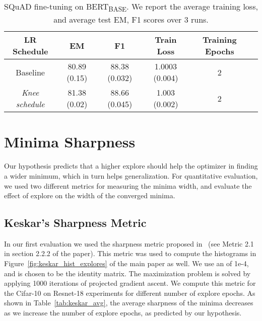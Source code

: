 \documentclass{article} \usepackage{iclr2021_conference,times}
\newcommand{\lrschedule}{\textit{Knee schedule}}
\begin{document}
\begin{table}[h]
\small
\centering
\caption{SQuAD fine-tuning on BERT\textsubscript{BASE}. We report the average training loss, and average test EM, F1 scores over 3 runs.}
\label{tab:squad_results}
{\setlength{\extrarowheight}{1pt}\begin{tabular}{cccccc}
  \toprule
  LR Schedule & EM  & F1 & Train Loss & Training Epochs \\
  \midrule
  Baseline   & 80.89 (0.15) & 88.38 (0.032) & 1.0003 (0.004) & 2\\
  \lrschedule{}{}   & 81.38 (0.02) & 88.66 (0.045) & 1.003 (0.002) & 2 \\
  \bottomrule
\end{tabular}}

\end{table}
 \section{Minima Sharpness}
\label{sec:metrics_for_wide_minima}
Our hypothesis predicts that a higher explore should help the optimizer in finding a wider minimum, which in turn helps generalization. For quantitative evaluation, we used two different metrics for measuring the minima width, and evaluate the effect of explore on the width of the converged minima.

\subsection{Keskar's Sharpness Metric~\cite{keskar2016large}}

In our first evaluation we used the sharpness metric proposed in~\cite{keskar2016large} (see Metric 2.1 in section 2.2.2 of the paper). This metric was used to compute the histograms in Figure~\ref{fig:keskar_hist_explores} of the main paper as well. We use an  of 1e-4, and  is chosen to be the identity matrix. The maximization problem is solved by applying 1000 iterations of projected gradient ascent. We compute this metric for the Cifar-10 on Resnet-18 experiments for different number of explore epochs. As shown in Table~\ref{tab:keskar_avg}, the average sharpness of the minima decreases as we increase the number of explore epochs, as predicted by our hypothesis.
\end{document}
